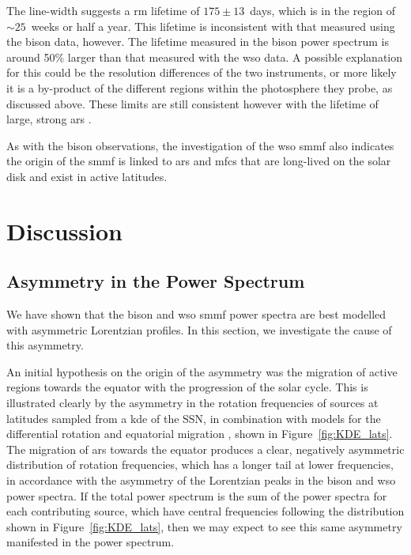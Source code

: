 The line-width suggests a \gls{rm} lifetime of $175 \pm 13$~days, which is in the region of $\sim 25$~weeks or half a year. This lifetime is inconsistent with that measured using the \gls{bison} data, however. The lifetime measured in the \gls{bison} power spectrum is around 50\% larger than that measured with the \gls{wso} data. A possible explanation for this could be the resolution differences of the two instruments, or more likely it is a by-product of the different regions within the photosphere they probe, as discussed above. These limits are still consistent however with the lifetime of large, strong \glspl{ar} \citep{schrijver_photospheric_1994, van_driel-gesztelyi_evolution_2015}.

As with the \gls{bison} observations, the investigation of the \gls{wso} \gls{smmf} also indicates the origin of the \gls{smmf} is linked to \glspl{ar} and \glspl{mfc} that are long-lived on the solar disk and exist in active latitudes.


\section{Discussion}\label{sec:SMMF_artificial}


\subsection{Asymmetry in the Power Spectrum}
\label{sec:asymmetry}

We have shown that the \gls{bison} and \gls{wso} \gls{smmf} power spectra are best modelled with asymmetric Lorentzian profiles. In this section, we investigate the cause of this asymmetry. 

An initial hypothesis on the origin of the asymmetry was the migration of active regions towards the equator with the progression of the solar cycle. This is illustrated clearly by the asymmetry in the rotation frequencies of sources at latitudes sampled from a \gls{kde} of the SSN, in combination with models for the differential rotation \citep{snodgrass_magnetic_1983} and equatorial migration \citep{li_latitude_2001}, shown in Figure~\ref{fig:KDE_lats}. The migration of \glspl{ar} towards the equator produces a clear, negatively asymmetric distribution of rotation frequencies, which has a longer tail at lower frequencies, in accordance with the asymmetry of the Lorentzian peaks in the \gls{bison} and \gls{wso} power spectra. If the total power spectrum is the sum of the power spectra for each contributing source, which have central frequencies following the distribution shown in Figure~\ref{fig:KDE_lats}, then we may expect to see this same asymmetry manifested in the power spectrum.

